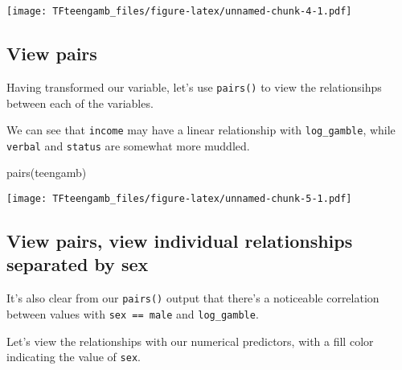 \documentclass[
]{article}
\newenvironment{Shaded}{\begin{snugshade}}{\end{snugshade}}
\newcommand{\FunctionTok}[1]{\textcolor[rgb]{0.00,0.00,0.00}{#1}}
\newcommand{\NormalTok}[1]{#1}
\begin{document}
\texttt{[image: TFteengamb\_files/figure-latex/unnamed-chunk-4-1.pdf]}

\hypertarget{view-pairs}{%
\subsection{View pairs}\label{view-pairs}}

Having transformed our variable, let's use \texttt{pairs()} to view the
relationsihps between each of the variables.

We can see that \texttt{income} may have a linear relationship with
\texttt{log\_gamble}, while \texttt{verbal} and \texttt{status} are
somewhat more muddled.

\begin{Shaded}
\begin{Highlighting}[]
\FunctionTok{pairs}\NormalTok{(teengamb)}
\end{Highlighting}
\end{Shaded}

\texttt{[image: TFteengamb\_files/figure-latex/unnamed-chunk-5-1.pdf]}

\hypertarget{view-pairs-view-individual-relationships-separated-by-sex}{%
\subsection{View pairs, view individual relationships separated by
sex}\label{view-pairs-view-individual-relationships-separated-by-sex}}

It's also clear from our \texttt{pairs()} output that there's a
noticeable correlation between values with \texttt{sex\ ==\ male} and
\texttt{log\_gamble}.

Let's view the relationships with our numerical predictors, with a fill
color indicating the value of \texttt{sex}.
\end{document}
